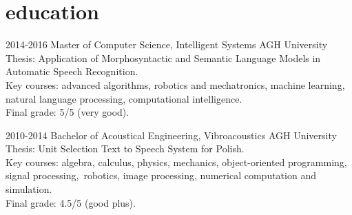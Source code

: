 \documentclass[]{friggeri-cv_osx}
\begin{document}

\begin{center}
\href{http:sebastiandziadzio.com}{\color{gray} \Large \faHome} \hspace{0.05cm}
\href{https://github.com/sebastiandziadzio}{\color{gray} \Large \faGithub} \hspace{0.05cm}
\href{mailto:sebastian.dziadzio@gmail.com}{\color{gray} \Large\faEnvelope} \hspace{0.05cm}
\href{https://twitter.com/sebadzia}{\color{gray} \Large\faTwitter} \hspace{0.05cm}
\href{http://pl.linkedin.com/in/sebastiandziadzio}{\color{gray} \Large\faLinkedin} \hspace{0.05cm}
\end{center}

\section{education}
\begin{entrylist}
\entry
{2014-2016}
{Master of Computer Science, Intelligent Systems}
{AGH University}
{Thesis: Application of Morphosyntactic and Semantic Language Models in Automatic Speech Recognition.\\
Key courses: advanced algorithms, robotics and mechatronics, machine learning, natural language processing, computational intelligence.\\
Final grade: 5/5 (very good).\\}

\entry
{2010-2014}
{Bachelor of Acoustical Engineering, Vibroacoustics}
{AGH University}
{Thesis: Unit Selection Text to Speech System for Polish.\\
Key courses: algebra, calculus, physics, mechanics, object-oriented programming, signal processing,~robotics, image processing, numerical computation and simulation.\\
Final grade: 4.5/5 (good plus).\\}

\end{entrylist}
\end{document}
